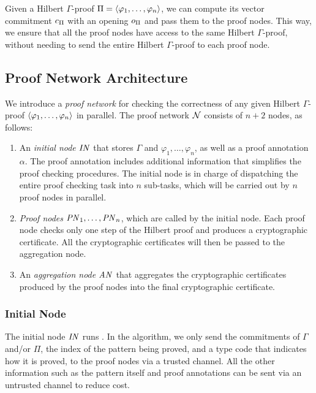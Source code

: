 \documentclass{article}
\begin{document}
Given a Hilbert $\Gamma$-proof $\Pi = \left\langle \varphi_1,\dots,\varphi_n \right\rangle$, we can compute its vector commitment $c_\Pi$ with an opening $o_\Pi$ and pass them to the proof nodes. This way, we ensure that all the proof nodes have access to the same Hilbert $\Gamma$-proof, without needing to send the entire Hilbert $\Gamma$-proof to each proof node. 

\subsection{Proof Network Architecture}
\label{sec:proof_network_arc}

We introduce a \emph{proof network} for checking
the correctness of any given Hilbert $\Gamma$-proof
$\left\langle \varphi_1,\dots,\varphi_n \right\rangle$ in parallel. 
The proof network $\mathcal{N}$ consists of $n+2$ nodes, as follows:
\begin{enumerate}
\item An \emph{initial node} $\mathit{IN}$ that stores
      $\Gamma$ and $\varphi_1,\dots,\varphi_n$, as well as
      a proof annotation $\alpha$. 
      The proof annotation includes additional information that simplifies
      the proof checking procedures. 
      The initial node is in charge of dispatching the entire proof checking task into $n$ sub-tasks, which will be carried out by $n$ proof nodes in parallel. 
\item \emph{Proof nodes} $\mathit{PN}_{1},\dots,\mathit{PN}_{n}$, which are called by the initial node. 
      Each proof node checks only one step of the Hilbert proof
      and produces a cryptographic certificate.
      All the cryptographic certificates will then be       passed to the aggregation node. 
\item An \emph{aggregation node} $\mathit{AN}$ that aggregates the cryptographic
      certificates produced by the proof nodes into the final cryptographic certificate. 
\end{enumerate}

\subsubsection{Initial Node}
\label{sec:initial_node}

The initial node $\mathit{IN}$ runs .
In the algorithm, we only send the commitments of $\Gamma$ and/or $\Pi$,
the index of the pattern being proved,
and a type code that indicates how it is proved,
to the proof nodes via a trusted channel. 
All the other information such as the pattern itself and proof annotations can be sent via an untrusted channel to reduce cost. 
\end{document}
